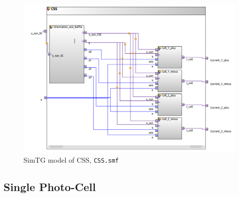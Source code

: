 \begin{figure}[H]
    \centering
    \includegraphics[width=1\linewidth]{doc//Graphics/CSS_model.png}
    \caption{SimTG model of CSS, \texttt{CSS.smf}}
    \label{fig:CSS_model}
\end{figure}



\subsection{Single Photo-Cell}


